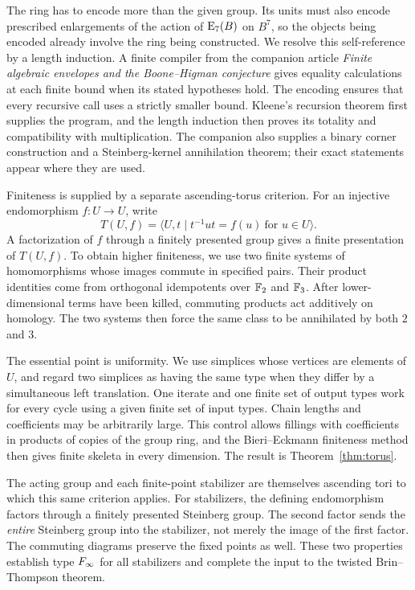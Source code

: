 The ring has to encode more than the given group. Its units must also
encode prescribed enlargements of the action of \(\mathrm E_7(B)\) on
\(B^7\), so the objects being encoded already involve the ring being
constructed. We resolve this self-reference by a length induction.
A finite compiler from the companion article
\emph{Finite algebraic envelopes and the Boone--Higman conjecture}
\citep{FoundationsCompanion} gives equality calculations at each finite
bound when its stated hypotheses hold. The encoding ensures that every recursive call uses
a strictly smaller bound. Kleene's recursion theorem first supplies the
program, and the length induction then proves its totality and
compatibility with multiplication. The companion also supplies a
binary corner construction and a Steinberg-kernel annihilation theorem;
their exact statements appear where they are used.

Finiteness is supplied by a separate ascending-torus criterion.
For an injective endomorphism \(f:U\to U\), write
\[
 T(U,f)=\langle U,t\mid t^{-1}ut=f(u)\ \text{for }u\in U\rangle.
\]
A factorization of \(f\) through a finitely presented group gives a
finite presentation of \(T(U,f)\). To obtain higher finiteness, we use
two finite systems of homomorphisms whose images commute in specified
pairs. Their product identities come from orthogonal idempotents over
\(\mathbb F_2\) and \(\mathbb F_3\). After lower-dimensional terms have been killed,
commuting products act additively on homology. The two systems then
force the same class to be annihilated by both \(2\) and \(3\).

The essential point is uniformity. We use simplices whose vertices are
elements of \(U\), and regard two simplices as having the same type
when they differ by a simultaneous left translation. One iterate and
one finite set of output types work for every cycle using a given
finite set of input types. Chain lengths and coefficients may be
arbitrarily large. This control allows fillings with coefficients in
products of copies of the group ring, and the Bieri--Eckmann finiteness
method then gives finite skeleta in every dimension. The result is
Theorem~\ref{thm:torus}.

The acting group and each finite-point stabilizer are themselves
ascending tori to which this same criterion applies. For stabilizers,
the defining endomorphism factors through a finitely presented
Steinberg group. The second factor sends the \emph{entire} Steinberg
group into the stabilizer, not merely the image of the first factor.
The commuting diagrams preserve the fixed points as well. These two
properties establish type \(F_\infty\) for all stabilizers and complete
the input to the twisted Brin--Thompson theorem.

